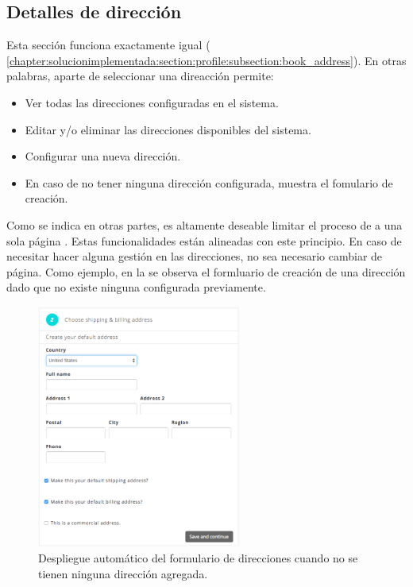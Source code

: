 \subsection{Detalles de dirección}\label{chapter:solucionimplementada:section:address}

	Esta sección funciona exactamente igual  ( \ref{chapter:solucionimplementada:section:profile:subsection:book_address}). En otras palabras, aparte de seleccionar una direacción permite:

	\begin{itemize}
		\item Ver todas las direcciones configuradas en el sistema.
		\item Editar y/o eliminar las direcciones disponibles del sistema.
		\item Configurar una nueva dirección.
		\item En caso de no tener ninguna dirección configurada, muestra el fomulario de creación.
	\end{itemize}

	Como se indica en otras partes, es altamente deseable limitar el proceso de \checkoutCOM a una sola página \cite{online_official_imediaconnection_best_practices_shopping_cart}. Estas funcionalidades están alineadas con este principio. En caso de necesitar hacer alguna gestión en las direcciones, no sea necesario cambiar de página.
	Como ejemplo, en la  se observa el formluario de creación de una dirección dado que no existe ninguna configurada previamente.

	\begin{figure}[H]
		\centering
		\includegraphics[width=0.6\textwidth]{figuras/shipping/form_address.png}
		\caption{Despliegue automático del formulario de direcciones cuando no se tienen ninguna dirección agregada.}
		\label{figure:checkout:form_address_default}
	\end{figure}